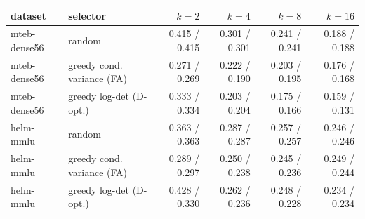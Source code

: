 \begin{tabular}{llrrrr}
\toprule
dataset & selector & $k=2$ & $k=4$ & $k=8$ & $k=16$ \\
\midrule
mteb-dense56 & random & 0.415 / 0.415 & 0.301 / 0.301 & 0.241 / 0.241 & 0.188 / 0.188 \\
mteb-dense56 & greedy cond. variance (FA) & 0.271 / 0.269 & 0.222 / 0.190 & 0.203 / 0.195 & 0.176 / 0.168 \\
mteb-dense56 & greedy log-det (D-opt.) & 0.333 / 0.334 & 0.203 / 0.204 & 0.175 / 0.166 & 0.159 / 0.131 \\
helm-mmlu & random & 0.363 / 0.363 & 0.287 / 0.287 & 0.257 / 0.257 & 0.246 / 0.246 \\
helm-mmlu & greedy cond. variance (FA) & 0.289 / 0.297 & 0.250 / 0.238 & 0.245 / 0.236 & 0.249 / 0.244 \\
helm-mmlu & greedy log-det (D-opt.) & 0.428 / 0.330 & 0.262 / 0.236 & 0.248 / 0.228 & 0.234 / 0.234 \\
\bottomrule
\end{tabular}

